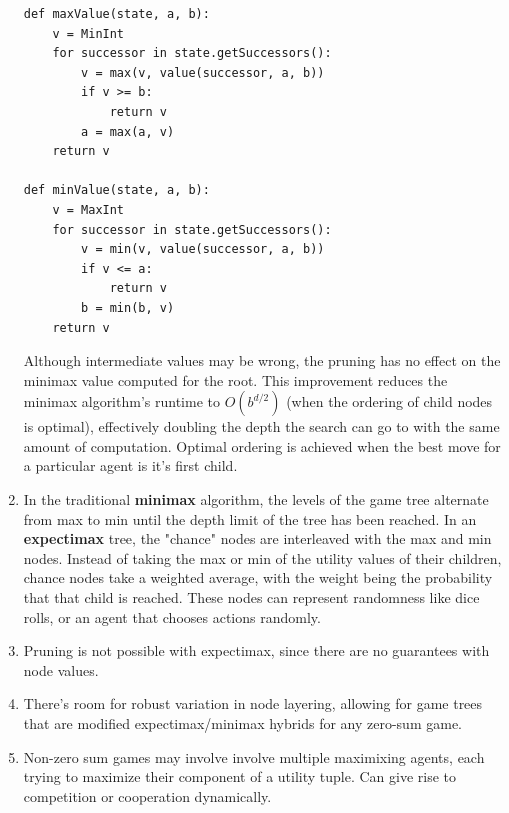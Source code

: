 \documentclass[10pt]{article}
\begin{document}
\begin{multicols}{2}
\begin{addmargin}[0.8em]{0.5em}
\begin{enumerate}[label=(\alph*)]
\begin{verbatim}
def maxValue(state, a, b):
    v = MinInt
    for successor in state.getSuccessors():
        v = max(v, value(successor, a, b))
        if v >= b:
            return v
        a = max(a, v)
    return v

def minValue(state, a, b):
    v = MaxInt
    for successor in state.getSuccessors():
        v = min(v, value(successor, a, b))
        if v <= a:
            return v
        b = min(b, v)
    return v
        \end{verbatim}
         Although intermediate values may be wrong, the pruning has no effect on the minimax value computed for the root. This improvement reduces the minimax algorithm's runtime to $O(b^{d/2})$ (when the ordering of child nodes is optimal), effectively doubling the depth the search can go to with the same amount of computation. Optimal ordering is achieved when the best move for a particular agent is it's first child. 
         \item In the traditional \textbf{minimax} algorithm, the levels of the game tree alternate from max to min until the depth limit of the tree has been reached. In an \textbf{expectimax} tree, the "chance" nodes are interleaved with the max and min nodes. Instead of taking the max or min of the utility values of their children, chance nodes take a weighted average, with the weight being the probability that that child is reached. These nodes can represent randomness like dice rolls, or an agent that chooses actions randomly.
         \item Pruning is not possible with expectimax, since there are no guarantees with node values.
         \item There’s room for robust variation in node layering, allowing for game trees that are modified expectimax/minimax hybrids for any zero-sum game.
         \item Non-zero sum games may involve involve multiple maximixing agents, each trying to maximize their component of a utility tuple. Can give rise to competition or cooperation dynamically.
    \end{enumerate}

\end{addmargin}
\end{multicols}
\end{document}
